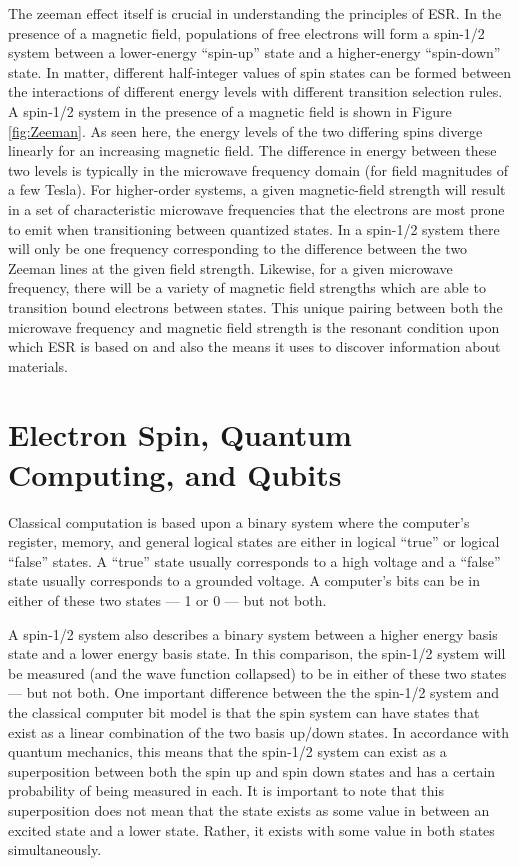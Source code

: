 \documentclass[oneside]{BYUPhys}
\begin{document}
The zeeman effect itself is crucial in understanding the principles of ESR. In the presence of a magnetic field, populations of free electrons will form a spin-1/2 system between a lower-energy ``spin-up'' state and a higher-energy ``spin-down'' state. In matter, different half-integer values of spin states can be formed between the interactions of different energy levels with different transition selection rules. A spin-1/2 system in the presence of a magnetic field is shown in Figure \ref{fig:Zeeman}. As seen here, the energy levels of the two differing spins diverge linearly for an increasing magnetic field. The difference in energy between these two levels is typically in the microwave frequency domain (for field magnitudes of a few Tesla). For higher-order systems, a given magnetic-field strength will result in a set of characteristic microwave frequencies that the electrons are most prone to emit when transitioning between quantized states. In a spin-1/2 system there will only be one frequency corresponding to the difference between the two Zeeman lines at the given field strength. Likewise, for a given microwave frequency, there will be a variety of magnetic field strengths which are able to transition bound electrons between states. This unique pairing between both the microwave frequency and magnetic field strength is the resonant condition upon which ESR is based on and also the means it uses to discover information about materials.

\section{Electron Spin, Quantum Computing, and Qubits}

Classical computation is based upon a binary system where the computer's register, memory, and general logical states are either in logical ``true'' or logical ``false'' states. A ``true'' state usually corresponds to a high voltage and a ``false'' state usually corresponds to a grounded voltage. A computer's bits can be in either of these two states --- 1 or 0 --- but not both.

A spin-1/2 system also describes a binary system between a higher energy basis state and a lower energy basis state. In this comparison, the spin-1/2 system will be measured (and the wave function collapsed) to be in either of these two states --- but not both. One important difference between the the spin-1/2 system and the classical computer bit model is that the spin system can have states that exist as a linear combination of the two basis up/down states. In accordance with quantum mechanics, this means that the spin-1/2 system can exist as a superposition between both the spin up and spin down states and has a certain probability of being measured in each. It is important to note that this superposition does not mean that the state exists as some value in between an excited state and a lower state. Rather, it exists with some value in both states simultaneously.
\end{document}
